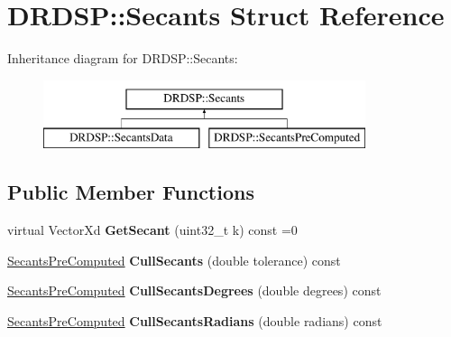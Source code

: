 \hypertarget{struct_d_r_d_s_p_1_1_secants}{\section{D\-R\-D\-S\-P\-:\-:Secants Struct Reference}
\label{struct_d_r_d_s_p_1_1_secants}
}
Inheritance diagram for D\-R\-D\-S\-P\-:\-:Secants\-:\begin{figure}[H]
\begin{center}
\leavevmode
\includegraphics[height=2.000000cm]{struct_d_r_d_s_p_1_1_secants}
\end{center}
\end{figure}
\subsection*{Public Member Functions}
\begin{DoxyCompactItemize}
\item 
\hypertarget{struct_d_r_d_s_p_1_1_secants_a9fd886acfd2ffd083685f1c3a58db4fc}{virtual Vector\-Xd {\bfseries Get\-Secant} (uint32\-\_\-t k) const =0}\label{struct_d_r_d_s_p_1_1_secants_a9fd886acfd2ffd083685f1c3a58db4fc}

\item 
\hypertarget{struct_d_r_d_s_p_1_1_secants_a9b6763bc1541a775e842e437448200ef}{\hyperlink{struct_d_r_d_s_p_1_1_secants_pre_computed}{Secants\-Pre\-Computed} {\bfseries Cull\-Secants} (double tolerance) const }\label{struct_d_r_d_s_p_1_1_secants_a9b6763bc1541a775e842e437448200ef}

\item 
\hypertarget{struct_d_r_d_s_p_1_1_secants_abc02bf01e73c2d89848a090c88666291}{\hyperlink{struct_d_r_d_s_p_1_1_secants_pre_computed}{Secants\-Pre\-Computed} {\bfseries Cull\-Secants\-Degrees} (double degrees) const }\label{struct_d_r_d_s_p_1_1_secants_abc02bf01e73c2d89848a090c88666291}

\item 
\hypertarget{struct_d_r_d_s_p_1_1_secants_aec22fc746a9047366d7b81729a2e4f8a}{\hyperlink{struct_d_r_d_s_p_1_1_secants_pre_computed}{Secants\-Pre\-Computed} {\bfseries Cull\-Secants\-Radians} (double radians) const }\label{struct_d_r_d_s_p_1_1_secants_aec22fc746a9047366d7b81729a2e4f8a}

\end{DoxyCompactItemize}
